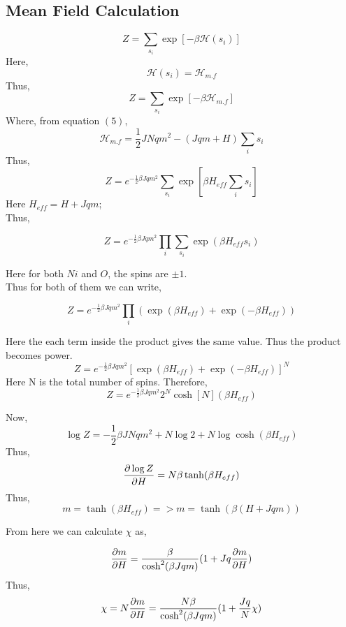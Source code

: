 \documentclass[24pt]{article}
\begin{document}
\begin{appendices}

\section{Mean Field Calculation}
$$
Z = \sum_{s_i}\exp[-\beta \mathcal{H}(s_i)]
$$
Here,
$$
\mathcal{H}(s_i)= \mathcal{H}_{m.f}
$$
Thus,
$$
Z = \sum_{s_i}\exp[-\beta \mathcal{H}_{m.f}]
$$
Where, from equation $(5)$, 
$$
\mathcal{H}_{m.f} = \frac{1}{2} J N q m^2 - (J q m + H)\sum_{i} s_i
$$
Thus, 
$$
Z = e^{-\frac{1}{2} \beta J q m^2} \sum_{s_i}\exp[\beta H_{eff} \sum_i s_i] 
$$
Here $H_{eff} = H + J q m $;\\
Thus,

$$
Z =  e^{-\frac{1}{2} \beta J q m^2}\prod_{i}\sum_{s_i}\exp(\beta H_{eff} s_i)
$$ 

Here for both $Ni$ and $O$, the spins are $\pm 1$.\\
Thus for both of them we can write,

$$
Z =  e^{-\frac{1}{2} \beta J q m^2}\prod_{i}(\exp(\beta H_{eff})+ \exp(- \beta H_{eff}))
$$

Here the each term inside the product gives the same value. Thus the product becomes power.
$$
Z =  e^{-\frac{1}{2} \beta J q m^2}[\exp(\beta H_{eff})+ \exp(- \beta H_{eff})]^N
$$
Here N is the total number of spins. 
Therefore,
$$
Z = e^{-\frac{1}{2} \beta J q m^2} 2^N \cosh[N](\beta H_{eff})
$$

Now, 
$$
\log Z = -\frac{1}{2} \beta J N q m^2 + N \log 2 + N \log\cosh(\beta H_{eff})
$$
Thus, 
$$ \pdv{\log Z}{H} = N \beta \tanh(\beta H_{eff})
$$
Thus,
$$
m = \tanh(\beta H_{eff})
=> m = \tanh(\beta (H + J q m))
$$

From here we can calculate $\chi$ as,

$$
\pdv{m}{H}= \frac{\beta}{\cosh[2](\beta J q m)} (1+ J q \pdv{m}{H})
$$
Thus, 
$$
\chi = N \pdv{m}{H} = \frac{N \beta}{\cosh[2](\beta J q m)} (1+ \frac{J q}{N} \chi)
$$
\end{appendices}
\end{document}

